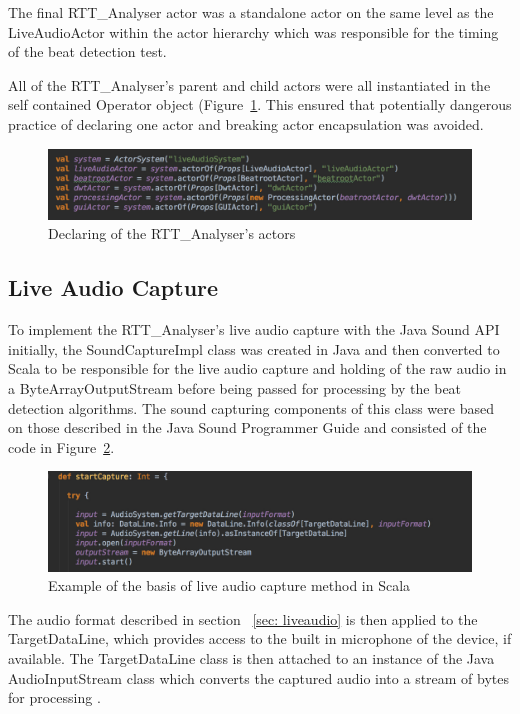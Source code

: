 \documentclass[a4paper, 11pt]{article}
\begin{document}
The final RTT\_Analyser actor was a standalone actor on the same level as the LiveAudioActor within the actor hierarchy which was responsible for the timing of the beat detection test.\par

All of the RTT\_Analyser's parent and child actors were all instantiated in the self contained Operator object (Figure~\ref{fig: props}. This ensured that potentially dangerous practice of declaring one actor and breaking actor encapsulation \cite{akkaActors} was avoided.  

\begin{figure}
\centering
\includegraphics[scale=0.35]{images/actorprops.jpg}
\caption{Declaring of the RTT\_Analyser's actors}
\label{fig: props}
\end{figure}

\subsection{Live Audio Capture}
To implement the RTT\_Analyser's live audio capture with the Java Sound API initially, the SoundCaptureImpl class was created in Java and then converted to Scala to be responsible for the live audio capture and holding of the raw audio in a ByteArrayOutputStream before being passed for processing by the beat detection algorithms. The sound capturing components of this class were based on those described in the Java Sound Programmer Guide \cite{javasound} and consisted of the code in Figure~\ref{fig: startcap}.

\begin{figure}[ht]
\centering
\includegraphics[scale=0.3]{images/startCap.jpg}
\caption{Example of the basis of live audio capture method in Scala}
\label{fig: startcap}
\end{figure}

The audio format described in section ~\ref{sec: liveaudio} is then applied to the TargetDataLine, which provides access to the built in microphone of the device, if available. The TargetDataLine class is then attached to an instance of the Java AudioInputStream class which converts the captured audio into a stream of bytes for processing \cite{soundTrail}. 
\end{document}
